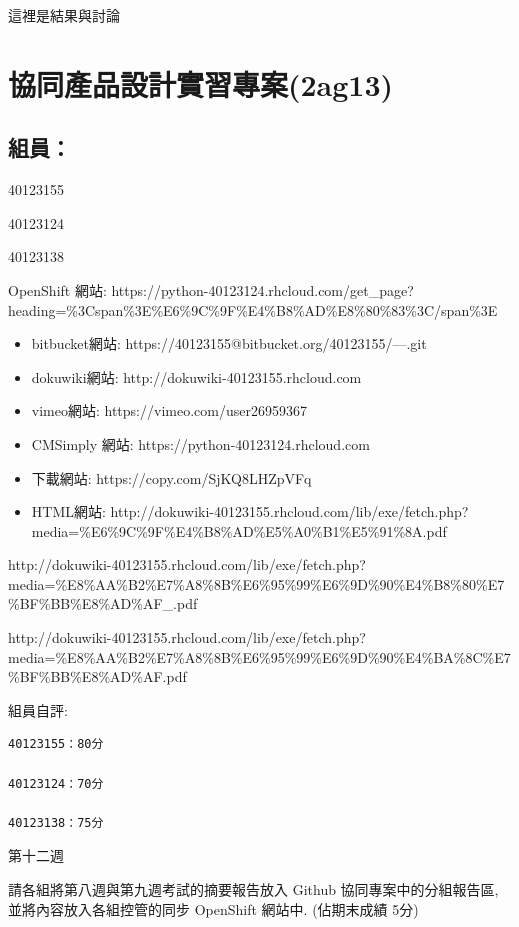 \documentclass[]{article}
\begin{document}
這裡是結果與討論

\section{協同產品設計實習專案(2ag13)}\label{ux5354ux540cux7522ux54c1ux8a2dux8a08ux5be6ux7fd2ux5c08ux68482ag13}

\subsection{組員：}\label{ux7d44ux54e1-3}

40123155

40123124

40123138

OpenShift 網站:
https://python-40123124.rhcloud.com/get\_page?heading=\%3Cspan\%3E\%E6\%9C\%9F\%E4\%B8\%AD\%E8\%80\%83\%3C/span\%3E

\begin{itemize}
\item
  bitbucket網站: https://40123155@bitbucket.org/40123155/---.git
\item
  dokuwiki網站: http://dokuwiki-40123155.rhcloud.com
\item
  vimeo網站: https://vimeo.com/user26959367
\item
  CMSimply 網站: https://python-40123124.rhcloud.com
\item
  下載網站: https://copy.com/SjKQ8LHZpVFq
\item
  HTML網站:
  http://dokuwiki-40123155.rhcloud.com/lib/exe/fetch.php?media=\%E6\%9C\%9F\%E4\%B8\%AD\%E5\%A0\%B1\%E5\%91\%8A.pdf
\end{itemize}

http://dokuwiki-40123155.rhcloud.com/lib/exe/fetch.php?media=\%E8\%AA\%B2\%E7\%A8\%8B\%E6\%95\%99\%E6\%9D\%90\%E4\%B8\%80\%E7\%BF\%BB\%E8\%AD\%AF\_.pdf

http://dokuwiki-40123155.rhcloud.com/lib/exe/fetch.php?media=\%E8\%AA\%B2\%E7\%A8\%8B\%E6\%95\%99\%E6\%9D\%90\%E4\%BA\%8C\%E7\%BF\%BB\%E8\%AD\%AF.pdf

組員自評:

\begin{verbatim}
40123155：80分

40123124：70分

40123138：75分
\end{verbatim}

第十二週

請各組將第八週與第九週考試的摘要報告放入 Github 協同專案中的分組報告區,
並將內容放入各組控管的同步 OpenShift 網站中. (佔期末成績 5分)
\end{document}
